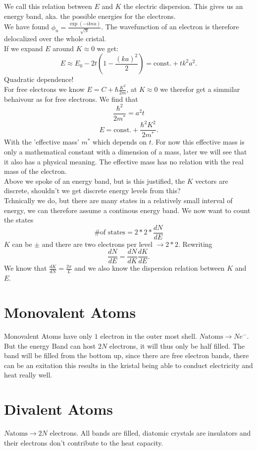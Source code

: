 \documentclass{report}
\begin{document}
We call this relation between $E$ and $K$ the electric dispersion. This gives us an energy band, aka. the possible energies for the electrons. \\
We have found $\phi_n = \frac{\exp\left( -ikna \right) }{\sqrt{N} }$. The wavefunction of an electron is therefore delocalized over the whole cristal.\\
If we expand $E$ around $K \approx 0$ we get: \[
	E \approx E_0 - 2t\left( 1 - \frac{\left( ka \right) ^2}{2} \right) = \text{const.} + t k^2a^2
.\] Quadratic dependence!\\
For free electrons we know $E = C + \hbar \frac{K^2}{2m}$, at $K \approx 0$ we therefor get a simmilar behaivour as for free electrons. We find that \[
\frac{\hbar^2}{2m^*} = a^2 t
\] \[
E = \text{const.} + \frac{\hbar^2 K^2}{2m^*}
.\] With the 'effective mass' $m^*$ which depends on $t$. For now this effective mass is only a mathematical constant with a dimension of a mass, later we will see that it also has a physical meaning. The effective mass has no relation with the real mass of the electron.\\
Above we spoke of an energy band, but is this justified, the $K$ vectors are discrete, shouldn't we get discrete energy levels from this?\\
Tchnically we do, but there are many states in a relatively small interval of energy, we can therefore assume a continous energy band.
We now want to count the states \[
\text{\# of states} = 2 * 2 * \frac{dN}{dE}
\] $K$ can be $\pm$ and there are two electrons per level $\to 2 * 2$. Rewriting \[
\frac{dN}{dE} = \frac{dN}{dK} \frac{dK}{dE}
.\] We know that $\frac{dK}{dN} = \frac{2\pi}{L}$ and we also know the dispersion relation between $K$ and $E$.
\section{Monovalent Atoms}
Monovalent Atoms have only $1$ electron in the outer most shell. $N \text{atoms} \to N e^-$.\\
But the energy Band can host $2N$ electrons, it will thus only be half filled. The band will be filled from the bottom up, since there are free electron bands, there can be an exitation this results in the kristal being able to conduct electricity and heat really well.
\section{Divalent Atoms}
$N \text{atoms} \to 2N$ electrons. All bands are filled, diatomic crystals are insulators and their electrons don't contribute to the heat capacity.
\end{document}
